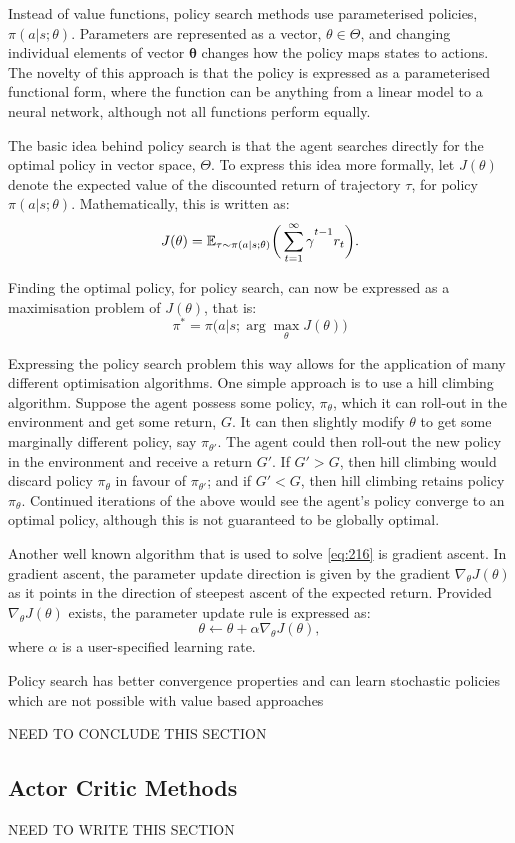 Instead of value functions, policy search methods use parameterised policies, $\pi(a | s;\theta)$. Parameters are represented as a vector, $\theta \in \Theta$, and changing individual elements of vector $\mathbf{\theta}$ changes how the policy maps states to actions. The novelty of this approach is that the policy is expressed as a parameterised functional form, where the function can be anything from a linear model to a neural network, although not all functions perform equally.

The basic idea behind policy search is that the agent searches directly for the optimal policy in vector space, $\Theta$. To express this idea more formally, let $J(\theta)$ denote the expected value of the discounted return of trajectory $\tau$, for policy $\pi(a|s;\theta)$. Mathematically, this is written as:
\begin{equation}
	J(\theta) = \mathbb{E}_{\tau \sim \pi(a|s;\theta)} \bigg( \sum_{t=1}^{\infty} \gamma\mystrut^{t-1} r_t \bigg). \label{eq:215}
\end{equation}

Finding the optimal policy, for policy search, can now be expressed as a maximisation problem of $J(\theta)$, that is: 
\begin{equation}
	\pi^* = \pi\big(a|s;\arg\max_{\theta} J(\theta)\big) \label{eq:216}
\end{equation}

Expressing the policy search problem this way allows for the application of many different optimisation algorithms. One simple approach is to use a hill climbing algorithm. Suppose the agent possess some policy, $\pi_{\theta}$, which it can roll-out in the environment and get some return, $G$. It can then slightly modify $\theta$ to get some marginally different policy, say $\pi_{\theta'}$. The agent could then roll-out the new policy in the environment and receive a return $G'$. If $G' > G$, then hill climbing would discard policy $\pi_{\theta}$ in favour of $\pi_{\theta'}$; and if $G' < G$, then hill climbing retains policy $\pi_{\theta}$. Continued iterations of the above would see the agent's policy converge to an optimal policy, although this is not guaranteed to be globally optimal.

Another well known algorithm that is used to solve \ref{eq:216} is gradient ascent. In gradient ascent, the parameter update direction is given by the gradient $\nabla_{\theta} J(\theta)$ as it points in the direction of steepest ascent of the expected return. Provided $\nabla_{\theta} J(\theta)$ exists, the parameter update rule is expressed as:
\begin{equation}
	\theta \gets \theta + \alpha \nabla_{\theta}J(\theta),
\end{equation}
where $\alpha$ is a user-specified learning rate.

Policy search has better convergence properties and can learn stochastic policies which are not possible with value based approaches

NEED TO CONCLUDE THIS SECTION



\subsection{Actor Critic Methods}

NEED TO WRITE THIS SECTION